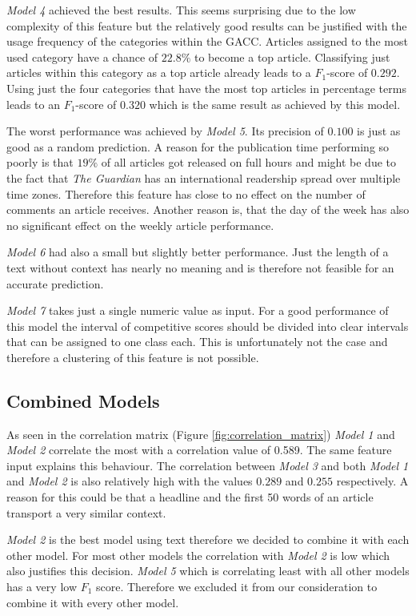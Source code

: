 \textit{Model 4} achieved the best results. This seems surprising due to the low complexity of this feature but the relatively good results can be justified with the usage frequency of the categories within the GACC. Articles assigned to the most used category have a chance of $22.8\%$ to become a top article. Classifying just articles within this category as a top article already leads to a $F_1$-score of $0.292$. Using just the four categories that have the most top articles in percentage terms leads to an $F_1$-score of $0.320$ which is the same result as achieved by this model.

The worst performance was achieved by \textit{Model 5}. Its precision of $0.100$ is just as good as a random prediction. A reason for the publication time performing so poorly is that $19\%$ of all articles got released on full hours and might be due to the fact that \textit{The Guardian} has an international readership spread over multiple time zones. Therefore this feature has close to no effect on the number of comments an article receives. Another reason is, that the day of the week has also no significant effect on the weekly article performance.

\textit{Model 6} had also a small but slightly better performance. Just the length of a text without context has nearly no meaning and is therefore not feasible for an accurate prediction.

\textit{Model 7} takes just a single numeric value as input. For a good performance of this model the interval of competitive scores should be divided into clear intervals that can be assigned to one class each. This is unfortunately not the case and therefore a clustering of this feature is not possible.



\subsection{Combined Models}
As seen in the correlation matrix (Figure \ref{fig:correlation_matrix}) \textit{Model 1} and \textit{Model 2} correlate the most with a correlation value of 0.589. The same feature input explains this behaviour. The correlation between \textit{Model 3} and both \textit{Model 1} and \textit{Model 2} is also relatively high with the values $0.289$ and $0.255$ respectively. A reason for this could be that a headline and the first 50 words of an article transport a very similar context.

\textit{Model 2} is the best model using text therefore we decided to combine it with each other model. For most other models the correlation with \textit{Model 2} is low which also justifies this decision.
\textit{Model 5} which is correlating least with all other models has a very low $F_1$ score. Therefore we excluded it from our consideration to combine it with every other model.

